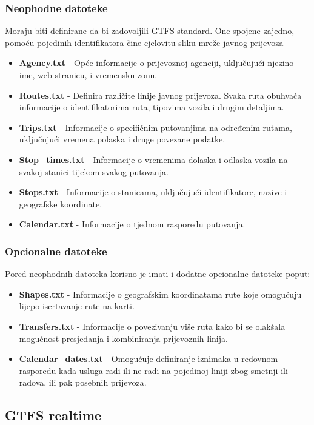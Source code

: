 \documentclass[zavrsnirad]{fer}
\begin{document}
\newpage

\subsubsection{Neophodne datoteke}
Moraju biti definirane da bi zadovoljili GTFS standard. One spojene zajedno, pomoću pojedinih identifikatora čine cjelovitu sliku mreže javnog prijevoza
\begin{itemize}
	\item \textbf{Agency.txt} -
	Opće informacije o prijevoznoj agenciji, uključujući njezino ime, web stranicu, i vremensku zonu.
	\item \textbf{Routes.txt} -
	Definira različite linije javnog prijevoza. Svaka ruta obuhvaća informacije o identifikatorima ruta, tipovima vozila i drugim detaljima.
	\item \textbf{Trips.txt} -
	Informacije o specifičnim putovanjima na određenim rutama, uključujući vremena polaska i druge povezane podatke.
	\item \textbf{Stop\_times.txt} -
	Informacije o vremenima dolaska i odlaska vozila na svakoj stanici tijekom svakog putovanja.
	\item \textbf{Stops.txt} -
	Informacije o stanicama, uključujući identifikatore, nazive i geografske koordinate.
	\item \textbf{Calendar.txt} -
	Informacije o tjednom rasporedu putovanja.
\end{itemize}

\subsubsection{Opcionalne datoteke}
Pored neophodnih datoteka korisno je imati i dodatne opcionalne datoteke poput:
\begin{itemize}
	\item \textbf{Shapes.txt} -
	Informacije o geografskim koordinatama rute koje omogućuju lijepo iscrtavanje rute na karti.
	\item \textbf{Transfers.txt} -
	Informacije o povezivanju više ruta kako bi se olakšala mogućnost presjedanja i kombiniranja prijevoznih linija.
	\item \textbf{Calendar\_dates.txt} -
	Omogućuje definiranje iznimaka u redovnom rasporedu kada usluga radi ili ne radi na pojedinoj liniji zbog smetnji ili radova, ili pak posebnih prijevoza.
\end{itemize}

\subsection[GTFS-rt]{GTFS realtime}
\end{document}
